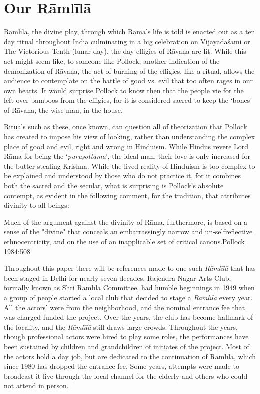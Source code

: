 \newpage


\section*{Our Rāmlīlā}

Rāmlīlā, the divine play, through which Rāma’s life is told is enacted out as a ten day ritual throughout India culminating in a big celebration on Vijayadaśami or The Victorious Tenth (lunar day), the day effigies of Rāvaṇa are lit. While this act might seem like, to someone like Pollock, another indication of the demonization of Rāvaṇa, the act of burning of the effigies, like a ritual, allows the audience to contemplate on the battle of good vs. evil that too often rages in our own hearts. It would surprise Pollock to know then that the people vie for the left over bamboos from the effigies, for it is considered sacred to keep the ‘bones’ of Rāvaṇa, the wise man, in the house.

Rituals such as these, once known, can question all of theorization that Pollock has created to impose his view of looking, rather than understanding the complex place of good and evil, right and wrong in Hinduism. While Hindus revere Lord Rāma for being the ‘\textit{puruṣottama}’, the ideal man, their love is only increased for the butter-stealing Krishna. While the lived reality of Hinduism is too complex to be explained and understood by those who do not practice it, for it combines both the sacred and the secular, what is surprising is Pollock’s absolute contempt, as evident in the following comment, for the tradition, that attributes divinity to all beings:

\begin{myquote}
Much of the argument against the divinity of Rāma, furthermore, is based on a sense of the "divine" that conceals an embarrassingly narrow and un-selfreflective ethnocentricity, and on the use of an inapplicable set of critical canons.\hfill Pollock 1984:508
\end{myquote}

Throughout this paper there will be references made to one such \textit{Rāmlīlā} that has been staged in Delhi for nearly seven decades. Rajendra Nagar Arts Club, formally known as Shri Rāmlīlā Committee, had humble beginnings in 1949 when a group of people started a local club that decided to stage a \textit{Rāmlīlā} every year. All the actors’ were from the neighborhood, and the nominal entrance fee that was charged funded the project. Over the years, the club has become hallmark of the locality, and the \textit{Rāmlīlā} still draws large crowds. Throughout the years, though professional actors were hired to play some roles, the performances have been sustained by children and grandchildren of initiates of the project. Most of the actors hold a day job, but are dedicated to the continuation of Rāmlīlā, which since 1980 has dropped the entrance fee. Some years, attempts were made to broadcast it live through the local channel for the elderly and others who could not attend in person.

